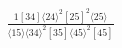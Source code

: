 \documentclass[varwidth, border=5pt]{standalone}
\begin{document}
\begin{my}
$\begin{gathered}
\scriptscriptstyle\frac{1[34]⟨24⟩^2[25]^2⟨25⟩}{⟨15⟩⟨34⟩^2[35]⟨45⟩^2[45]}
\end{gathered}$
\end{my}
\end{document}
